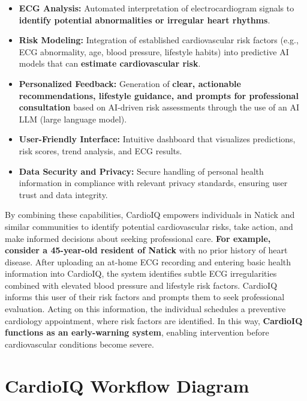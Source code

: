 \documentclass[12pt]{article}
\begin{document}
\begin{itemize}[leftmargin=1.5em]
    \item \textbf{ECG Analysis:} Automated interpretation of electrocardiogram signals to \textbf{identify potential abnormalities or irregular heart rhythms}.
    \item \textbf{Risk Modeling:} Integration of established cardiovascular risk factors (e.g., ECG abnormality, age, blood pressure, lifestyle habits) into predictive AI models that can \textbf{estimate cardiovascular risk}.
    \item \textbf{Personalized Feedback:} Generation of \textbf{clear, actionable recommendations, lifestyle guidance, and prompts for professional consultation} based on AI-driven risk assessments through the use of an AI LLM (large language model).
    \item \textbf{User-Friendly Interface:} Intuitive dashboard that visualizes predictions, risk scores, trend analysis, and ECG results.
    \item \textbf{Data Security and Privacy:} Secure handling of personal health information in compliance with relevant privacy standards, ensuring user trust and data integrity.
\end{itemize}


By combining these capabilities, CardioIQ empowers individuals in Natick and similar communities to identify potential cardiovascular risks, take action, and make informed decisions about seeking professional care. \textbf{For example, consider a 45-year-old resident of Natick} with no prior history of heart disease. After uploading an at-home ECG recording and entering basic health information into CardioIQ, the system identifies subtle ECG irregularities combined with elevated blood pressure and lifestyle risk factors. CardioIQ informs this user of their risk factors and prompts them to seek professional evaluation. Acting on this information, the individual schedules a preventive cardiology appointment, where risk factors are identified. In this way, \textbf{CardioIQ functions as an early-warning system}, enabling intervention before cardiovascular conditions become severe.

\section*{CardioIQ Workflow Diagram}
\end{document}
